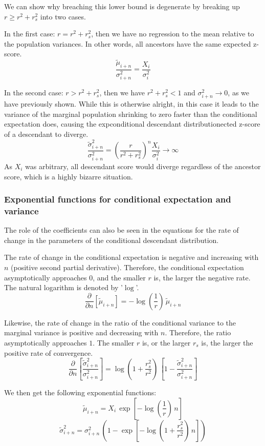 \documentclass[letterpaper,10pt]{article} %
\begin{document}
We can show why breaching this lower bound is degenerate by breaking up $r \geq r^2 + r_s^2$ into two cases.

In the first case: $r = r^2 + r_s^2$, then we have no regression to the mean relative to the population variances. In other words, all ancestors have the same expected z-score.
$$\frac{\tilde{\mu}_{i+n}}{\sigma_{i+n}^2} = \frac{X_i}{\sigma_i^2}$$


In the second case: $r > r^2 + r_s^2$, then we have $r^2 + r_s^2 < 1$ and $\sigma_{i+n}^2 \rightarrow 0$, as we have previously shown. While this is otherwise alright, in this case it leads to the variance of the marginal population shrinking to zero faster than the conditional expectation does, causing the expconditional descendant distributionected z-score of a descendant to diverge.
$$\frac{\tilde{\sigma}_{i+n}^2}{\sigma_{i+n}^2} = (\frac{r}{r^2+r_s^2})^n \frac{X_i}{\sigma_i^2} \rightarrow \infty$$
As $X_i$ was arbitrary, all descendant score would diverge regardless of the ancestor score, which is a highly bizarre situation.


\subsubsection*{Exponential functions for conditional expectation and variance}

The role of the coefficients can also be seen in the equations for the rate of change in the parameters of the conditional descendant distribution.

The rate of change in the conditional expectation is negative and increasing with $n$ (positive second partial derivative). Therefore, the conditional expectation asymptotically approaches $0$, and the smaller $r$ is, the larger the negative rate. The natural logarithm is denoted by '$\log$'.
$$\frac{\partial }{\partial n}[\tilde{\mu}_{i+n}] = -\log(\frac{1}{r}) \, \tilde{\mu}_{i+n}$$


Likewise, the rate of change in the ratio of the conditional variance to the marginal variance is positive and decreasing with $n$. Therefore, the ratio asymptotically approaches $1$. The smaller $r$ is, or the larger $r_s$ is, the larger the positive rate of convergence.
$$\frac{\partial }{\partial n}[\frac{\tilde{\sigma}_{i+n}^2}{\sigma_{i+n}^2}] = \log(1+\frac{r_s^2}{r^2}) \, [1 - \frac{\tilde{\sigma}_{i+n}^2}{\sigma_{i+n}^2}]$$

We then get the following exponential functions:
$$\tilde{\mu}_{i+n} = X_i \, \exp[-\log(\frac{1}{r}) \, n]$$
$$\tilde{\sigma}_{i+n}^2 = \sigma_{i+n}^2 \, (1 - \exp[-\log(1+\frac{r_s^2}{r^2}) \, n])$$
\end{document}
